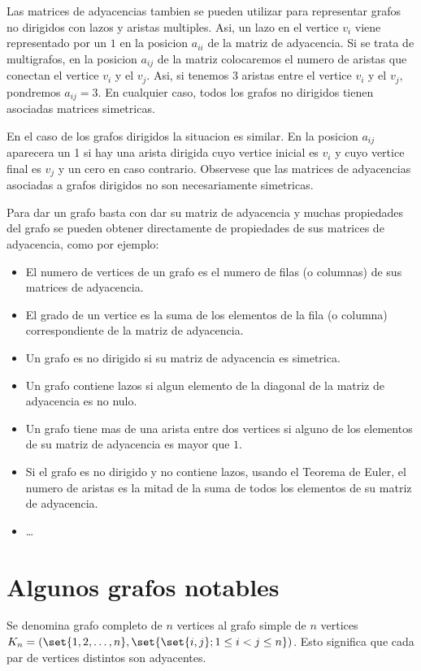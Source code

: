 \begin{remark}
	Las matrices de adyacencias tambien se pueden utilizar para representar grafos no dirigidos con lazos y aristas multiples. Asi, un lazo en el vertice \(v_i \) viene representado por un \(1 \) en la posicion \(a_{ii}\) de la matriz de adyacencia. Si se trata de multigrafos, en la posicion \(a_{ij }\) de la matriz colocaremos el numero de aristas que conectan el vertice \(v_i \) y el \(v_j \). Asi, si tenemos 3 aristas entre el vertice \(v_i \) y el \(v_j ,\) pondremos \(a_{ij} = 3 \). En cualquier caso, todos los grafos no dirigidos tienen asociadas matrices simetricas.
\end{remark}

\begin{remark}
	En el caso de los grafos dirigidos la situacion es similar. En la posicion \(a_{ij }\) aparecera un 1 si hay una arista dirigida cuyo vertice inicial es \(v_i \) y cuyo vertice final es \(v_j \) y un cero en caso contrario. Observese que las matrices de adyacencias asociadas a grafos dirigidos no son necesariamente simetricas.
\end{remark}

Para dar un grafo basta con dar su matriz de adyacencia y muchas propiedades del grafo se pueden obtener directamente de propiedades de sus matrices de adyacencia, como por ejemplo:
\begin{itemize}
	\item El numero de vertices de un grafo es el numero de filas (o columnas) de sus matrices de adyacencia.
	\item El grado de un vertice es la suma de los elementos de la fila (o columna) correspondiente de la matriz de adyacencia.
	\item Un grafo es no dirigido si su matriz de adyacencia es simetrica.
	\item Un grafo contiene lazos si algun elemento de la diagonal de la matriz de adyacencia es no nulo.
	\item Un grafo tiene mas de una arista entre dos vertices si alguno de los elementos de su matriz de adyacencia es mayor que \(1 \).
	\item Si el grafo es no dirigido y no contiene lazos, usando el Teorema de Euler, el numero de aristas es la mitad de la suma de todos los elementos de su matriz de adyacencia.
	\item \dots
\end{itemize}

\section{Algunos grafos notables}
\begin{definition}
	Se denomina grafo completo de \(n \) vertices al grafo simple de \(n \) vertices \(K_n = (\set{1,2,\ldots,n}, \set{\set{i,j}; 1 \leq i < j \leq n })\). Esto significa que cada par de vertices distintos son adyacentes.
\end{definition}

